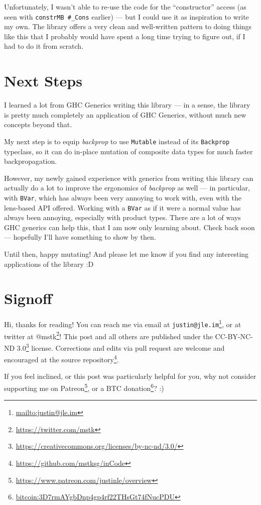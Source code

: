 \documentclass[]{article}
\renewcommand{\href}[2]{#2\footnote{\url{#1}}}
\begin{document}
Unfortunately, I wasn't able to re-use the code for the ``constructor'' access
(as seen with \texttt{constrMB\ \#\_Cons} earlier) --- but I could use it as
inspiration to write my own. The library offers a very clean and well-written
pattern to doing things like this that I probably would have spent a long time
trying to figure out, if I had to do it from scratch.

\hypertarget{next-steps}{%
\section{Next Steps}\label{next-steps}}

I learned a lot from GHC Generics writing this library --- in a sense, the
library is pretty much completely an application of GHC Generics, without much
new concepts beyond that.

My next step is to equip \emph{backprop} to use \texttt{Mutable} instead of its
\texttt{Backprop} typeclass, so it can do in-place mutation of composite data
types for much faster backpropagation.

However, my newly gained experience with generics from writing this library can
actually do a lot to improve the ergonomics of \emph{backprop} as well --- in
particular, with \texttt{BVar}, which has always been very annoying to work
with, even with the lens-based API offered. Working with a \texttt{BVar} as if
it were a normal value has always been annoying, especially with product types.
There are a lot of ways GHC generics can help this, that I am now only learning
about. Check back soon --- hopefully I'll have something to show by then.

Until then, happy mutating! And please let me know if you find any interesting
applications of the library :D

\hypertarget{signoff}{%
\section{Signoff}\label{signoff}}

Hi, thanks for reading! You can reach me via email at
\href{mailto:justin@jle.im}{\nolinkurl{justin@jle.im}}, or at twitter at
\href{https://twitter.com/mstk}{@mstk}! This post and all others are published
under the \href{https://creativecommons.org/licenses/by-nc-nd/3.0/}{CC-BY-NC-ND
3.0} license. Corrections and edits via pull request are welcome and encouraged
at \href{https://github.com/mstksg/inCode}{the source repository}.

If you feel inclined, or this post was particularly helpful for you, why not
consider \href{https://www.patreon.com/justinle/overview}{supporting me on
Patreon}, or a \href{bitcoin:3D7rmAYgbDnp4gp4rf22THsGt74fNucPDU}{BTC donation}?
:)
\end{document}
